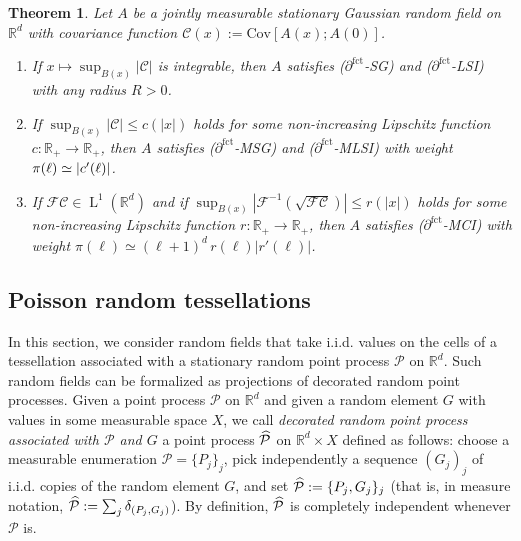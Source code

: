 \documentclass[10pt]{amsart}
\newtheorem{theo}{Theorem}[section]
\theoremstyle{definition}\newtheorem{defi}[theo]{Definition}\newtheorem{rema}[theo]{Remark}\newtheorem{exam}[theo]{Example}\newtheorem{exem}[theo]{Example}\newtheorem{nota}[theo]{Notation}
\newcommand{\R}{\mathbb R}
\newcommand{\Cc}{\mathcal C}
\newcommand{\Pc}{\mathcal P}
\newcommand{\F}{\mathcal F}
\DeclareMathOperator{\Ld}{L}
\newcommand{\parfct}[1]{\partial_{#1}^{\operatorname{fct}}}
\newcommand{\cov}[2]{\mathrm{Cov}\left[#1;#2\right]}
\newcommand*{\romanenumi}{\renewcommand*{\theenumi}{\roman{enumi}}}
\renewcommand*{\hat}[1]{\mathchoice{\widehat{#1}}{\widehat{#1}}{\oldhat{#1}}{\oldhat{#1}}}\let\oldexists\exists
\renewcommand*{\exists}{\mathrel{\oldexists}}
\begin{document}
\begin{theo}\label{cor:gaussiansg}
Let $A$ be a jointly measurable stationary Gaussian random field on $\R^d$ with covariance function $\Cc(x):=\cov{A(x)}{A(0)}$.
\begin{enumerate}\romanenumi
\item \label{theo3.1.1}If $x\mapsto \sup_{B(x)}|\Cc|$ is integrable, then $A$ satisfies \emph{($\parfct{}$-SG)} and \emph{($\parfct{}$-LSI)} with any radius $R>0$.
\item \label{theo3.1.2}If $\sup_{B(x)}|\Cc| \le c(|x|)$ holds for some non-increasing Lipschitz function\linebreak$c:\R_+\to\R_+$, then $A$ satisfies \emph{($\parfct{}$-MSG)} and \emph{($\parfct{}$-MLSI)} with weight $\pi(\ell)\linebreak\simeq |c'(\ell)|$.
\item \label{theo3.1.3}If $\F\Cc\in\Ld^1(\R^d)$ and if $\sup_{B(x)}|\F^{-1}(\sqrt{\F\Cc})|\le r(|x|)$ holds for some non-increasing Lipschitz function $r:\R_+\to\R_+$, then $A$ satisfies \emph{($\parfct{}$-MCI)} with weight $\pi(\ell)\simeq (\ell+1)^d\,r(\ell)|r'(\ell)|$.
\qedhere
\end{enumerate}
\end{theo}


\subsection{Poisson random tessellations}\label{chap:tessel}
In this section, we consider random fields that take i.i.d. values on the cells of a tessellation associated with a stationary random point process $\Pc$ on $\R^d$. Such random fields can be formalized as projections of decorated random point processes. Given a point process $\Pc$ on $\R^d$ and given a random element $G$ with values in some measurable space $X$, we call \emph{decorated random point process associated with $\Pc$ and $G$} a point process $\hat\Pc$ on $\R^d\times X$ defined as follows: choose a measurable enumeration $\Pc=\{P_j\}_j$, pick independently a sequence $(G_j)_j$ of i.i.d. copies of the random element $G$, and set $\hat\Pc:=\{P_j,G_j\}_j$ (that is, in measure notation, $\hat\Pc:=\sum_j\delta_{(P_j,G_j)}$). By definition, $\hat\Pc$ is completely independent whenever $\Pc$ is.

\end{document}
